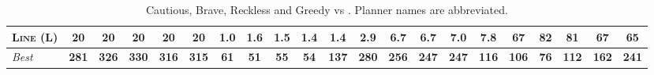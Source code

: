 \begin{table}[tb]
{\begin{tabular}{|l||ccccc||ccccc||ccccc||ccccc||}
\textsc{Line} (L)&\textbf{20}&\textbf{20}&\textbf{20}&\textbf{20}&\textbf{20}&\textbf{1.0}&1.6&1.5&1.4&1.4&\textbf{2.9}&6.7&6.7&7.0&7.8&67&82&81&67&\textbf{65}
\\\hline
\textit{Best}&\textbf{281}&\textbf{326}&\textbf{330}&\textbf{316}&\textbf{315}&\textbf{61}&\textbf{51}&\textbf{55}&\textbf{54}&\textbf{137}&\textbf{280}&\textbf{256}&\textbf{247}&\textbf{247}&\textbf{116}&\textbf{106}&\textbf{76}&\textbf{112}&\textbf{162}&\textbf{241}\\\hline

        \end{tabular}}
        \caption{Cautious, Brave, Reckless and Greedy \pattyd vs \pattyo. Planner names are abbreviated.}
        \label{tab:cbrg}
        \end{table}
        